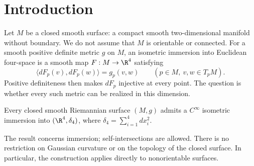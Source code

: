 \begin{abstract}
Every closed smooth Riemannian surface admits a smooth isometric immersion into
Euclidean four-space, without an orientability assumption. This resolves the
closed-surface form of the classical four-dimensional isometric-immersion problem.
\end{abstract}
\section{Introduction}\label{sec:introduction}

Let $M$ be a closed smooth surface: a compact smooth two-dimensional manifold
without boundary. We do not assume that $M$ is orientable or connected.
For a smooth positive definite metric $g$ on $M$, an isometric immersion into
Euclidean four-space is a smooth map $F:M\to\R^4$ satisfying
\[
 \langle dF_p(v),dF_p(w)\rangle=g_p(v,w)
 \qquad(p\in M,\ v,w\in T_pM).
\]
Positive definiteness then makes $dF_p$ injective at every point.
The question is whether every such metric can be realized in this dimension.

\begin{theorem}\label{thm:main}
Every closed smooth Riemannian surface $(M,g)$ admits a $C^\infty$ isometric
immersion into $(\R^4,\delta_4)$, where $\delta_4=\sum_{i=1}^4 dx_i^2$.
\end{theorem}

The result concerns immersion; self-intersections are allowed. There is no
restriction on Gaussian curvature or on the topology of the closed surface.
In particular, the construction applies directly to nonorientable surfaces.

